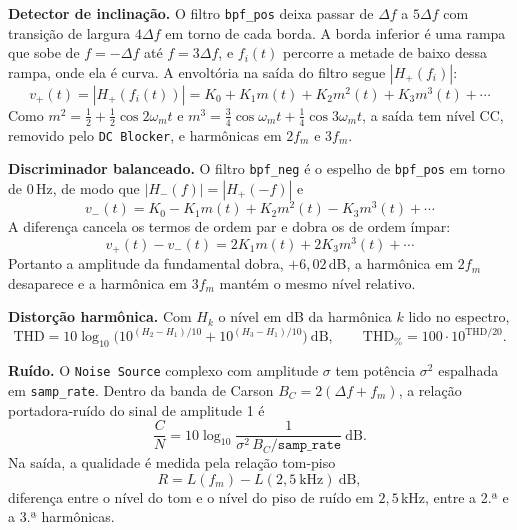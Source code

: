 \documentclass[11pt,a4paper]{article}
\begin{document}
\textbf{Detector de inclinação.} O filtro \texttt{bpf\_pos} deixa passar de
$\Delta f$ a $5\Delta f$ com transição de largura $4\Delta f$ em torno de cada
borda. A borda inferior é uma rampa que sobe de $f=-\Delta f$ até
$f=3\Delta f$, e $f_i(t)$ percorre a metade de baixo dessa rampa, onde ela é
curva. A envoltória na saída do filtro segue $|H_+(f_i)|$:
\begin{equation}
  v_+(t) = |H_+(f_i(t))| = K_0 + K_1 m(t) + K_2 m^2(t) + K_3 m^3(t) + \cdots
  \label{eq:vpos}
\end{equation}
Como $m^2 = \tfrac12 + \tfrac12\cos 2\omega_m t$ e
$m^3 = \tfrac34\cos\omega_m t + \tfrac14\cos 3\omega_m t$, a saída tem nível CC,
removido pelo \texttt{DC Blocker}, e harmônicas em $2f_m$ e $3f_m$.

\textbf{Discriminador balanceado.} O filtro \texttt{bpf\_neg} é o espelho de
\texttt{bpf\_pos} em torno de $0$\,Hz, de modo que $|H_-(f)| = |H_+(-f)|$ e
\begin{equation}
  v_-(t) = K_0 - K_1 m(t) + K_2 m^2(t) - K_3 m^3(t) + \cdots
\end{equation}
A diferença cancela os termos de ordem par e dobra os de ordem ímpar:
\begin{equation}
  v_+(t) - v_-(t) = 2K_1 m(t) + 2K_3 m^3(t) + \cdots
  \label{eq:balanced}
\end{equation}
Portanto a amplitude da fundamental dobra, $+6{,}02$\,dB, a harmônica em $2f_m$
desaparece e a harmônica em $3f_m$ mantém o mesmo nível relativo.

\textbf{Distorção harmônica.} Com $H_k$ o nível em dB da harmônica $k$ lido no
espectro,
\begin{equation}
  \mathrm{THD} = 10\log_{10}\!\Big(10^{(H_2-H_1)/10} + 10^{(H_3-H_1)/10}\Big)\ \text{dB},
  \qquad
  \mathrm{THD}_{\%} = 100\cdot 10^{\mathrm{THD}/20}.
  \label{eq:thd}
\end{equation}

\textbf{Ruído.} O \texttt{Noise Source} complexo com amplitude $\sigma$ tem
potência $\sigma^2$ espalhada em \texttt{samp\_rate}. Dentro da banda de Carson
$B_C = 2(\Delta f + f_m)$, a relação portadora-ruído do sinal de amplitude 1 é
\begin{equation}
  \frac{C}{N} = 10\log_{10}\frac{1}{\sigma^2\,B_C/\texttt{samp\_rate}}\ \text{dB}.
  \label{eq:cn}
\end{equation}
Na saída, a qualidade é medida pela relação tom-piso
\begin{equation}
  R = L(f_m) - L(2{,}5\ \text{kHz})\ \text{dB},
  \label{eq:r}
\end{equation}
diferença entre o nível do tom e o nível do piso de ruído em $2{,}5$\,kHz, entre
a 2.ª e a 3.ª harmônicas.
\end{document}
